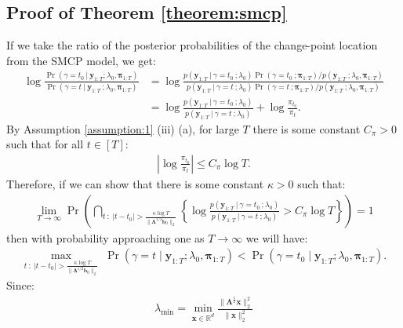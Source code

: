 \subsection{Proof of Theorem \ref{theorem:smcp}}
\label{app:localization-smcp}

If we take the ratio of the posterior probabilities of the change-point location from the SMCP model, we get:
\begin{align*}
    \log \frac{\Pr(\gamma = t_0  \:|\: \mathbf{y}_{1:T} ; \lambda_0,\boldsymbol{\pi}_{1:T})}{\Pr(\gamma = t  \:|\: \mathbf{y}_{1:T} \:; \lambda_0,\boldsymbol{\pi}_{1:T})} &=  \log \frac{p(\mathbf{y}_{1:T} \:|\:\gamma = t_0 \:; \lambda_0)\Pr(\gamma = t_0 \:; \boldsymbol{\pi}_{1:T})/ p(\mathbf{y}_{1:T}\:;\lambda_0,\boldsymbol{\pi}_{1:T})}{p(\mathbf{y}_{1:T} \:|\:\gamma = t \:; \lambda_0)\Pr(\gamma = t \:;\boldsymbol{\pi}_{1:T})/ p(\mathbf{y}_{1:T}\:;\lambda_0,\boldsymbol{\pi}_{1:T})} \tag{Bayes' rule} \\
    &= \log \frac{p(\mathbf{y}_{1:T} \:|\:\gamma = t_0 \:; \lambda_0)}{p(\mathbf{y}_{1:T} \:|\:\gamma = t \:; \lambda_0)} + \log \frac{\pi_{t_0}}{\pi_t}.
\end{align*}
By Assumption \ref{assumption:1} (iii) (a), for large $T$ there is some constant $C_\pi > 0$ such that for all $t \in [T]$: 
\begin{align}\label{eq:thm1-prior-bd}
    \left|\log \frac{\pi_{t_0}}{\pi_t}\right| \leq C_\pi \log T.
\end{align}
Therefore, if we can show that there is some constant $\kappa > 0$ such that:
\begin{align}
    \lim_{T\to\infty}\Pr\left(\bigcap_{t\::\: |t - t_0| > \frac{\kappa\log T}{\lVert\boldsymbol{\Lambda}^{1/2}\mathbf{b}_0\rVert_2}}\left\{ \log \frac{p(\mathbf{y}_{1:T} \:|\:\gamma = t_0 \:; \lambda_0)}{p(\mathbf{y}_{1:T} \:|\:\gamma = t \:; \lambda_0)} > C_\pi \log T\right\}\right) = 1 \label{eq:thm1-result}
\end{align}
then with probability approaching one as $T \to \infty$ we will have:
\begin{align*}
    \max_{t\::\: |t - t_0| > \frac{\kappa\log T}{\lVert\boldsymbol{\Lambda}^{1/2}\mathbf{b}_0\rVert_2}} \; \Pr(\gamma = t  \;|\; \mathbf{y}_{1:T} ; \lambda_0,\boldsymbol{\pi}_{1:T}) < \Pr(\gamma = t_0  \;|\; \mathbf{y}_{1:T} ; \lambda_0,\boldsymbol{\pi}_{1:T}).
\end{align*}
Since: 
\begin{align*}
    \lambda_{\min} = \min_{\mathbf{x}\in\mathbb{R}^d}\frac{\lVert\boldsymbol{\Lambda}^{\frac{1}{2}}\mathbf{x}\rVert_2^2}{\lVert\mathbf{x}\rVert_2^2}
\end{align*}

